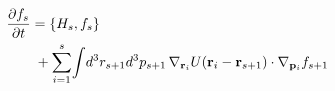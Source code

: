 \documentclass[preview]{standalone}
\begin{document}
\begin{align*}
\special{dvisvgm:raw <g id='unique000'>}\pdv{f_s}{t}&=\pb{H_s}{f_s}\\&\;+\sum_{i=1}^{s}\!\int\! d^3r_{s+1}d^3p_{s+1}\,\nabla_{\va r_i}U(\va r_i-\va r_{s+1})\cdot\nabla_{\va p_i}f_{s+1}\special{dvisvgm:raw </g>}
\end{align*}
\end{document}
